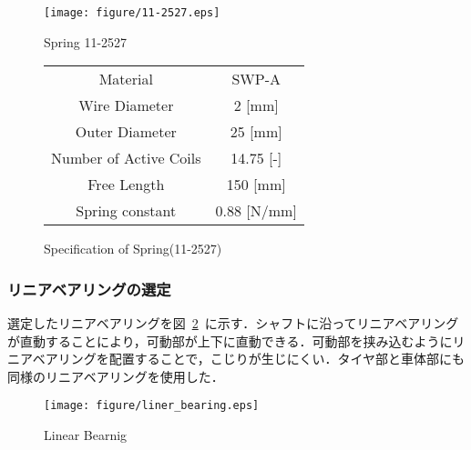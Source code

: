 \documentclass[a4paper,12pt]{article_vdlab_sotsuron}
\begin{document}
\vspace*{10mm}
\begin{figure}[htp]
  \begin{minipage}{0.5\textwidth}
    \begin{center}
      \texttt{[image: figure/11-2527.eps]}
      \vspace*{3mm}
      \caption{Spring 11-2527}
      \label{fig:11-2527}
    \end{center}
  \end{minipage}
  \begin{minipage}{0.5\textwidth}
      \begin{center}
	\makeatletter
	\def\@captype{table}   
	\makeatother
	\caption{Specification of Spring(11-2527)\cite{5}}
	\label{tab:11-2527}
	  \begin{tabular}{cc}\hline
	    Material & SWP-A \\
	    Wire Diameter & 2 [mm] \\
	    Outer Diameter & 25 [mm] \\
	    Number of Active Coils & 14.75 [-] \\
	    Free Length & 150 [mm] \\
	    Spring constant & 0.88 [N/mm] \\\hline
	  \end{tabular}  
	\end{center}
  \end{minipage}
\end{figure}

\vspace*{10mm}
\subsubsection{リニアベアリングの選定}
選定したリニアベアリングを図~\ref{fig:liner_bearing}~に示す．シャフトに沿ってリニアベアリングが直動することにより，可動部が上下に直動できる．可動部を挟み込むようにリニアベアリングを配置することで，こじりが生じにくい．タイヤ部と車体部にも同様のリニアベアリングを使用した．

\vspace*{10mm}
\begin{figure}[htp]
  \begin{center}
    \texttt{[image: figure/liner\_bearing.eps]}
    \vspace*{3mm}
    \caption{Linear Bearnig}
    \label{fig:liner_bearing}
  \end{center}
\end{figure}
\end{document}
